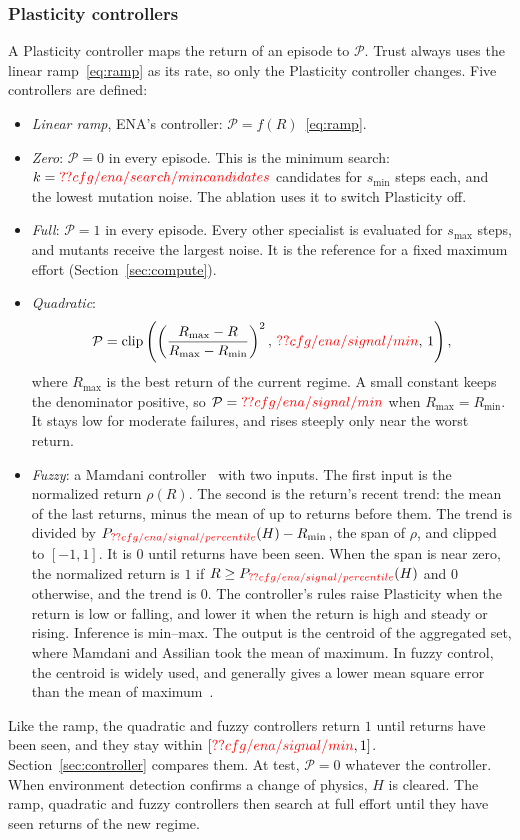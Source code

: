 \subsubsection{Plasticity controllers}
\label{sec:controllers}
A Plasticity controller maps the return of an episode to $\mathcal{P}$. Trust always uses the linear ramp~\eqref{eq:ramp} as its rate, so only the Plasticity controller changes. Five controllers are defined:
\begin{itemize}
\item \textit{Linear ramp}, ENA's controller: $\mathcal{P} = f(R)$~\eqref{eq:ramp}.
\item \textit{Zero}: $\mathcal{P} = 0$ in every episode. This is the minimum search: $k=\Res{cfg/ena/search/mincandidates}$ candidates for $s_{\min}$ steps each, and the lowest mutation noise. The ablation uses it to switch Plasticity off.
\item \textit{Full}: $\mathcal{P} = 1$ in every episode. Every other specialist is evaluated for $s_{\max}$ steps, and mutants receive the largest noise. It is the reference for a fixed maximum effort (Section~\ref{sec:compute}).
\item \textit{Quadratic}:
\[
\mathcal{P} = \mathrm{clip}\left(\left(\frac{R_{\max} - R}{R_{\max} - R_{\min}}\right)^{2},\, \Res{cfg/ena/signal/min},\, 1\right),
\]
where $R_{\max}$ is the best return of the current regime. A small constant keeps the denominator positive, so $\mathcal{P} = \Res{cfg/ena/signal/min}$ when $R_{\max} = R_{\min}$. It stays low for moderate failures, and rises steeply only near the worst return.
\item \textit{Fuzzy}: a Mamdani controller~\cite{mamdani1975experiment} with two inputs. The first input is the normalized return $\rho(R)$. The second is the return's recent trend: the mean of the last  returns, minus the mean of up to  returns before them. The trend is divided by $P_{\Res{cfg/ena/signal/percentile}}(H) - R_{\min}$, the span of $\rho$, and clipped to $[-1, 1]$. It is $0$ until  returns have been seen. When the span is near zero, the normalized return is $1$ if $R \ge P_{\Res{cfg/ena/signal/percentile}}(H)$ and $0$ otherwise, and the trend is $0$. The controller's  rules raise Plasticity when the return is low or falling, and lower it when the return is high and steady or rising. Inference is min--max. The output is the centroid of the aggregated set, where Mamdani and Assilian took the mean of maximum. In fuzzy control, the centroid is widely used, and generally gives a lower mean square error than the mean of maximum~\cite{lee1990fuzzy}.
\end{itemize}
Like the ramp, the quadratic and fuzzy controllers return $1$ until  returns have been seen, and they stay within $[\Res{cfg/ena/signal/min}, 1]$. Section~\ref{sec:controller} compares them. At test, $\mathcal{P}=0$ whatever the controller. When environment detection confirms a change of physics, $H$ is cleared. The ramp, quadratic and fuzzy controllers then search at full effort until they have seen  returns of the new regime.

